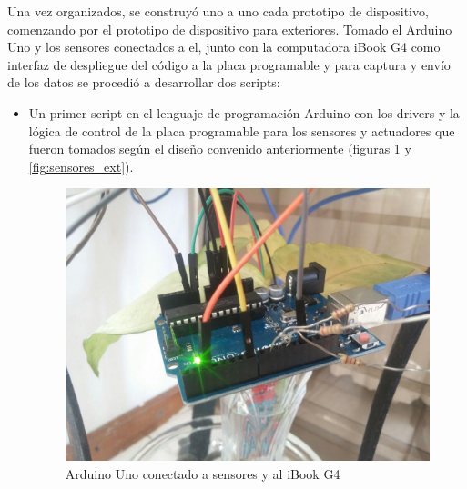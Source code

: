 Una vez organizados, se construyó uno a uno cada prototipo de dispositivo, comenzando por el prototipo de dispositivo para exteriores. Tomado el Arduino Uno y los sensores conectados a el, junto con la computadora iBook G4 como interfaz de despliegue del código a la placa programable y para captura y envío de los datos se procedió a desarrollar dos scripts:
\begin{itemize}
\item Un primer script en el lenguaje de programación Arduino con los drivers y la lógica de control de la placa programable  para los sensores y actuadores que fueron tomados según el diseño convenido anteriormente (figuras \ref{fig:arduino_ext} y \ref{fig:sensores_ext}).
\begin{figure}[!htb]
\centering
\includegraphics[scale=0.225]{./Figuras/arduino_ext.jpg}
\caption{Arduino Uno conectado a sensores y al iBook G4}
\label{fig:arduino_ext}
\end{figure}


\end{itemize}
